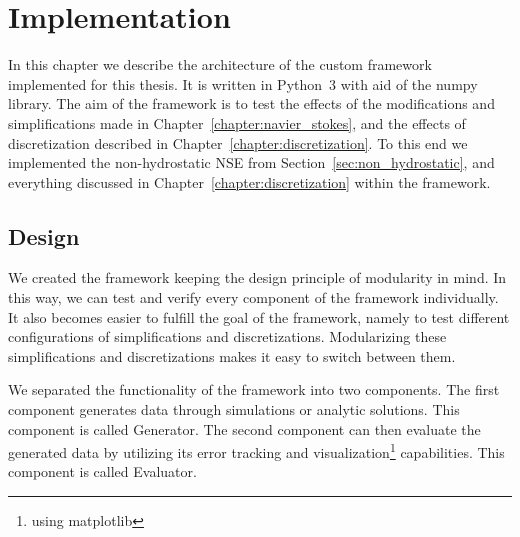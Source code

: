 
\chapter{Implementation}\label{chapter:implementation}
In this chapter we describe the architecture of the custom framework implemented for this thesis.
It is written in Python~3 with aid of the numpy library.
The aim of the framework is to test the effects of the modifications and simplifications made in Chapter~\ref{chapter:navier_stokes}, and the effects of discretization described in Chapter~\ref{chapter:discretization}.
To this end we implemented the non-hydrostatic NSE from Section~\ref{sec:non_hydrostatic}, and everything discussed in Chapter~\ref{chapter:discretization} within the framework.


\section{Design}
We created the framework keeping the design principle of modularity in mind.
In this way, we can test and verify every component of the framework individually.
It also becomes easier to fulfill the goal of the framework, namely to test different configurations of simplifications and discretizations.
Modularizing these simplifications and discretizations makes it easy to switch between them.

We separated the functionality of the framework into two components.
The first component generates data through simulations or analytic solutions.
This component is called Generator.
The second component can then evaluate the generated data by utilizing its error tracking and visualization\footnote{using matplotlib} capabilities.
This component is called Evaluator.


